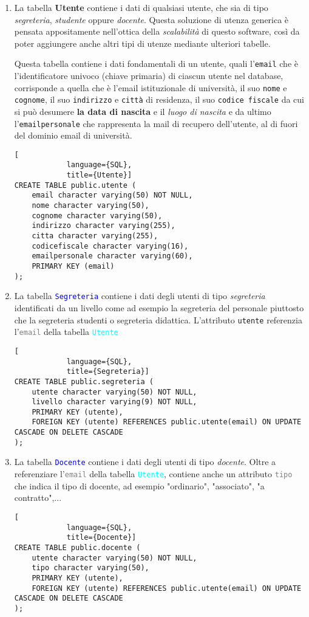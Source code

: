 \documentclass{article}
\newcommand{\tabb}[1]{\texttt{\textcolor{blue}{#1}}}
\newcommand{\tab}[1]{\texttt{\textcolor{cyan}{#1}}}
\newcommand{\attr}[1]{\texttt{\textcolor{gray}{#1}}}
\begin{document}
    \begin{enumerate}
        \item La tabella \textbf{Utente} contiene i dati di qualsiasi utente, che sia di tipo \emph{segreteria}, \emph{studente} oppure \emph{docente}. Questa soluzione di utenza generica è pensata appositamente nell'ottica della \emph{scalabilità} di questo software, così da poter aggiungere anche altri tipi di utenze mediante ulteriori tabelle.

        Questa tabella contiene i dati fondamentali di un utente, quali l'\texttt{email} che è l'identificatore univoco (chiave primaria) di ciascun utente nel database, corrisponde a quella che è l'email istituzionale di università, il suo \texttt{nome} e \texttt{cognome}, il suo \texttt{indirizzo} e \texttt{città} di residenza, il suo \texttt{codice fiscale} da cui si può desumere \textbf{la data di nascita} e il \textit{luogo di nascita} e da ultimo l'\texttt{emailpersonale} che rappresenta la mail di recupero dell'utente, al di fuori del dominio email di università.
        \begin{lstlisting}[
            language={SQL},
            title={Utente}]
CREATE TABLE public.utente (
    email character varying(50) NOT NULL,
    nome character varying(50),
    cognome character varying(50),
    indirizzo character varying(255),
    citta character varying(255),
    codicefiscale character varying(16),
    emailpersonale character varying(60),
    PRIMARY KEY (email)
);
        \end{lstlisting}

        \item La tabella \tabb{Segreteria} contiene i dati degli utenti di tipo \textit{segreteria} identificati da un livello come ad esempio la segreteria del personale piuttosto che la segreteria studenti o segreteria didattica. L'attributo \texttt{utente} referenzia l'\attr{email} della tabella \tab{Utente}
        \begin{lstlisting}[
            language={SQL},
            title={Segreteria}]
CREATE TABLE public.segreteria (
    utente character varying(50) NOT NULL,
    livello character varying(9) NOT NULL,
    PRIMARY KEY (utente),
    FOREIGN KEY (utente) REFERENCES public.utente(email) ON UPDATE CASCADE ON DELETE CASCADE
);
        \end{lstlisting}

        \pagebreak

        \item La tabella \tabb{Docente} contiene i dati degli utenti di tipo \textit{docente}. Oltre a referenziare l'\attr{email} della tabella \tab{Utente}, contiene anche un attributo \attr{tipo} che indica il tipo di docente, ad esempio "ordinario", "associato", "a contratto",...
        \begin{lstlisting}[
            language={SQL},
            title={Docente}]
CREATE TABLE public.docente (
    utente character varying(50) NOT NULL,
    tipo character varying(50),
    PRIMARY KEY (utente),
    FOREIGN KEY (utente) REFERENCES public.utente(email) ON UPDATE CASCADE ON DELETE CASCADE
);
        \end{lstlisting}


\end{enumerate}
\end{document}
